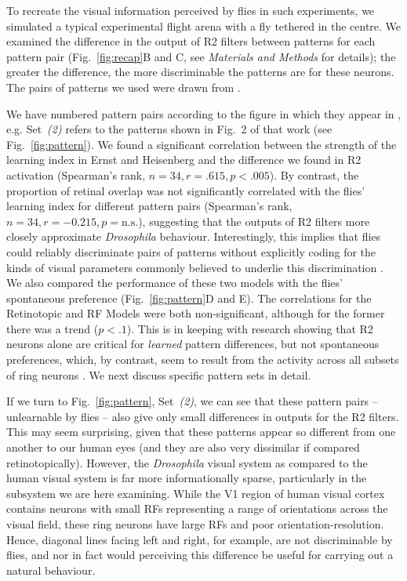 To recreate the visual information perceived by flies in such experiments, we simulated a typical experimental flight arena with a fly tethered in the centre.
We examined the difference in the output of R2 filters between patterns for each pattern pair (Fig.~\ref{fig:recap}B and C, see \emph{Materials and Methods} for details); the greater the difference, the more discriminable the patterns are for these neurons.
The pairs of patterns we used were drawn from \cite{Ernst1999}. 


We have numbered pattern pairs according to the figure in which they appear in \cite{Ernst1999}, e.g. Set~\emph{(2)} refers to the patterns shown in Fig.~2 of that work (see Fig.~\ref{fig:pattern}).
We found a significant correlation between the strength of the learning index in Ernst and Heisenberg \cite{Ernst1999} and the difference we found in R2 activation (Spearman's rank, $n=34, r=.615, p<.005$).
By contrast, the proportion of retinal overlap was not significantly correlated with the flies' learning index for different pattern pairs (Spearman's rank, $n=34, r= -0.215, p=\mathrm{n.s.}$), suggesting that the outputs of R2 filters more closely approximate \emph{Drosophila} behaviour.
Interestingly, this implies that flies could reliably discriminate pairs of patterns without explicitly coding for the kinds of visual parameters commonly believed to underlie this discrimination \cite{Pan2009,Liu2006,Ernst1999}.
We also compared the performance of these two models with the flies' spontaneous preference (Fig.~\ref{fig:pattern}D and E).
The correlations for the Retinotopic and RF Models were both non-significant, although for the former there was a trend ($p<.1$).
This is in keeping with research showing that R2 neurons alone are critical for \emph{learned} pattern differences, but not spontaneous preferences, which, by contrast, seem to result from the activity across all subsets of ring neurons \texthl{[cit]}.
We next discuss specific pattern sets in detail.


If we turn to Fig.~\ref{fig:pattern}, Set~\emph{(2)}, we can see that these pattern pairs -- unlearnable by flies -- also give only small differences in outputs for the R2 filters.
This may seem surprising, given that these patterns appear so different from one another to our human eyes (and they are also very dissimilar if compared retinotopically).
However, the \emph{Drosophila} visual system as compared to the human visual system is far more informationally sparse, particularly in the subsystem we are here examining.
While the V1 region of human visual cortex contains neurons with small RFs representing a range of orientations across the visual field, these ring neurons have large RFs and poor orientation-resolution.
Hence, diagonal lines facing left and right, for example, are not discriminable by flies, and nor in fact would perceiving this difference be useful for carrying out a natural behaviour.


